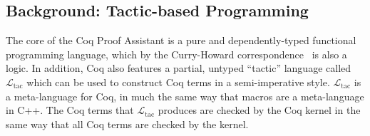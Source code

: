 \documentclass[preprint]{sigplanconf}
\newcommand{\ltac}[0]{\ensuremath{\mathcal{L}_{\mathrm{tac}}}}
\begin{document}
\subsection{Background: Tactic-based Programming}
\label{sec:tactic-based}

The core of the Coq Proof Assistant is a pure and dependently-typed functional programming language, which by the Curry-Howard correspondence~\cite{} is also a logic.  In addition, Coq also features a partial, untyped ``tactic'' language called \ltac{} which can be used to construct Coq terms in a semi-imperative style.  \ltac{} is a meta-language for Coq, in much the same way that macros are a meta-language in C++.  The Coq terms that \ltac{} produces are checked by the Coq kernel in the same way that all Coq terms are checked by the kernel.  
\end{document}
